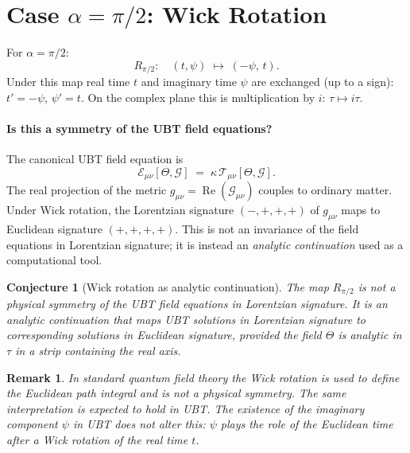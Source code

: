 \documentclass[12pt]{article}
\newtheorem{conjecture}{Conjecture}
\newtheorem{remark}{Remark}
\begin{document}
\section{Case $\alpha = \pi/2$: Wick Rotation}
For $\alpha = \pi/2$:
\begin{equation}
  R_{\pi/2}:\quad (t,\psi) \;\mapsto\; (-\psi,\, t).
\end{equation}
Under this map real time $t$ and imaginary time $\psi$ are exchanged
(up to a sign): $t' = -\psi$, $\psi' = t$.  On the complex plane this
is multiplication by $i$: $\tau \mapsto i\tau$.

\paragraph{Is this a symmetry of the UBT field equations?}
The canonical UBT field equation is
\begin{equation}
  \mathcal{E}_{\mu\nu}[\Theta, \mathcal{G}]
  \;=\; \kappa\,\mathcal{T}_{\mu\nu}[\Theta, \mathcal{G}].
  \label{eq:field_eq}
\end{equation}
The real projection of the metric $g_{\mu\nu} = \operatorname{Re}(\mathcal{G}_{\mu\nu})$
couples to ordinary matter.  Under Wick rotation, the Lorentzian signature
$(-,+,+,+)$ of $g_{\mu\nu}$ maps to Euclidean signature $(+,+,+,+)$.
This is not an invariance of the field equations in Lorentzian signature;
it is instead an \emph{analytic continuation} used as a computational tool.

\begin{conjecture}[Wick rotation as analytic continuation]
\label{conj:wick}
The map $R_{\pi/2}$ is not a physical symmetry of the UBT field equations
in Lorentzian signature.  It is an \emph{analytic continuation} that maps
UBT solutions in Lorentzian signature to corresponding solutions in
Euclidean signature, provided the field $\Theta$ is analytic in $\tau$ in
a strip containing the real axis.
\end{conjecture}

\begin{remark}
In standard quantum field theory the Wick rotation is used to define the
Euclidean path integral and is not a physical symmetry.  The same
interpretation is expected to hold in UBT.  The existence of the imaginary
component $\psi$ in UBT does not alter this: $\psi$ plays the role of the
Euclidean time after a Wick rotation of the real time $t$.
\end{remark}
\end{document}
